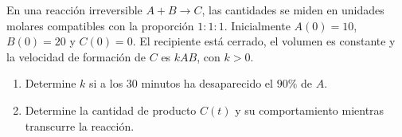 En una reacción irreversible $A+B\longrightarrow C$, las cantidades se miden en unidades molares compatibles con la proporción $1:1:1$. Inicialmente $A(0)=10$, $B(0)=20$ y $C(0)=0$. El recipiente está cerrado, el volumen es constante y la velocidad de formación de $C$ es $kAB$, con $k>0$.

\begin{enumerate}[label=(\alph*),ref=\alph*,leftmargin=*]
\item Determine $k$ si a los $30$ minutos ha desaparecido el $90\%$ de $A$.
\item Determine la cantidad de producto $C(t)$ y su comportamiento mientras transcurre la reacción.
\end{enumerate}
